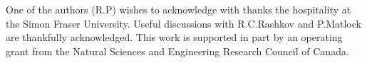 \documentclass[a4paper,12pt]{article}
\begin{document}
\vspace{0.5cm}

{

\vspace{0.5cm}

One of the authors (R.P) wishes to acknowledge with thanks the hospitality 
at the Simon Fraser University. Useful discussions with R.C.Rashkov and 
P.Matlock are thankfully acknowledged. This work is supported in part by an 
operating grant from the Natural Sciences and Engineering Research Council 
of Canada.

\vspace{0.5cm}

{}

\vspace{0.5cm}

\begin{enumerate}


\end{enumerate}}
\end{document}
